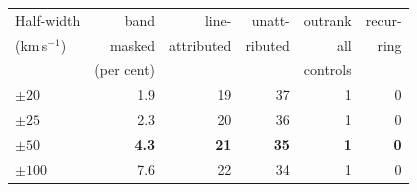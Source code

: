 \begin{tabular}{@{}lrrrrr@{}}
\hline
Half-width & band & line- & unatt- & outrank & recur- \\
(km\,s$^{-1}$) & masked & attributed & ributed & all & ring \\
 & (per cent) & & & controls & \\
\hline
$\pm20$ & 1.9 & 19 & 37 & 1 & 0 \\
$\pm25$ & 2.3 & 20 & 36 & 1 & 0 \\
\textbf{$\pm50$} & \textbf{4.3} & \textbf{21} & \textbf{35} & \textbf{1} & \textbf{0} \\
$\pm100$ & 7.6 & 22 & 34 & 1 & 0 \\
\hline
\end{tabular}
